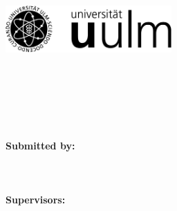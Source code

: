 \thispagestyle{empty}

\begin{titlepage}
  \sffamily
  \raggedright

  \hfill
  \includegraphics[height=1.8cm]{logo_uulm_sw.png}\\[2em]

  {\footnotesize
    \hspace*{115mm}
    \parbox[t]{35mm}{
      \bfseries \faculty\\

      \mdseries \institute
    }\\[2cm]
  
    \parbox{140mm}{\bfseries \LARGE \titleOfWork}\\[2.5em]
    {\bfseries \LARGE \subjectOfWork}\\[4em]

    {\footnotesize \bfseries Submitted by:}\\
    {\footnotesize \authorName\\ \authorEmail \\ \matrikelnummer} \\[2em]

    {\footnotesize \bfseries Supervisors:}\\
    {\footnotesize \supervisor}\\[2em]
  }
  
\end{titlepage}
  


